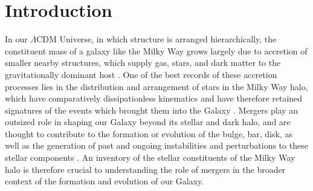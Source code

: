 
\section{Introduction}

In our $\Lambda$CDM Universe, in which structure is arranged hierarchically, the constituent mass of a galaxy like the Milky Way grows largely due to accretion of smaller nearby structures, which supply gas, stars, and dark matter to the gravitationally dominant host \parencite{searle78,white91,helmi99,bullock05}. One of the best records of these accretion processes lies in the distribution and arrangement of stars in the Milky Way halo, which have comparatively dissipationless kinematics and have therefore retained signatures of the events which brought them into the Galaxy \parencite{freeman02,johnston08}. Mergers play an outsized role in shaping our Galaxy beyond its stellar and dark halo, and are thought to contribute to the formation or evolution of the bulge, bar, disk, as well as the generation of past and ongoing instabilities and perturbations to these stellar components \parencite[][]{bland-hawthorn16,helmi20}. An inventory of the stellar constituents of the Milky Way halo is therefore crucial to understanding the role of mergers in the broader context of the formation and evolution of our Galaxy.

